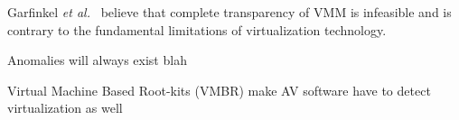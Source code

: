 Garfinkel {\em et al.}~\cite{garfinkel2007} believe that complete
transparency of VMM is infeasible and is contrary to the fundamental limitations
of virtualization technology.

Anomalies will always exist blah

Virtual Machine Based Root-kits (VMBR) make AV software have to detect
virtualization as well~\cite{thompson, ferrie2007}

